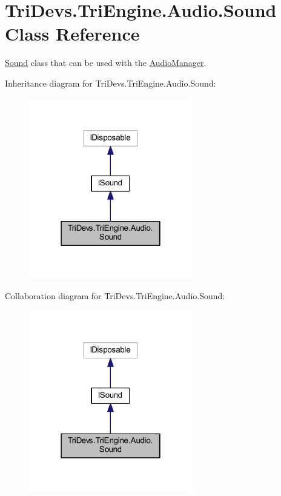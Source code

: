 \hypertarget{class_tri_devs_1_1_tri_engine_1_1_audio_1_1_sound}{\section{Tri\-Devs.\-Tri\-Engine.\-Audio.\-Sound Class Reference}
\label{class_tri_devs_1_1_tri_engine_1_1_audio_1_1_sound}
}


\hyperlink{class_tri_devs_1_1_tri_engine_1_1_audio_1_1_sound}{Sound} class that can be used with the \hyperlink{class_tri_devs_1_1_tri_engine_1_1_audio_1_1_audio_manager}{Audio\-Manager}.  




Inheritance diagram for Tri\-Devs.\-Tri\-Engine.\-Audio.\-Sound\-:
\nopagebreak
\begin{figure}[H]
\begin{center}
\leavevmode
\includegraphics[width=202pt]{class_tri_devs_1_1_tri_engine_1_1_audio_1_1_sound__inherit__graph}
\end{center}
\end{figure}


Collaboration diagram for Tri\-Devs.\-Tri\-Engine.\-Audio.\-Sound\-:
\nopagebreak
\begin{figure}[H]
\begin{center}
\leavevmode
\includegraphics[width=202pt]{class_tri_devs_1_1_tri_engine_1_1_audio_1_1_sound__coll__graph}
\end{center}
\end{figure}
